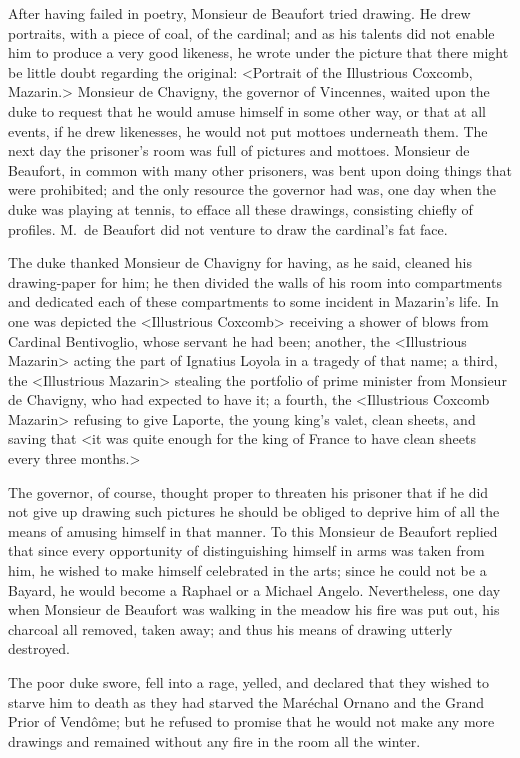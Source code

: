 After having failed in poetry, Monsieur de Beaufort tried drawing. He drew portraits, with a piece of coal, of the cardinal; and as his talents did not enable him to produce a very good likeness, he wrote under the picture that there might be little doubt regarding the original: <Portrait of the Illustrious Coxcomb, Mazarin.> Monsieur de Chavigny, the governor of Vincennes, waited upon the duke to request that he would amuse himself in some other way, or that at all events, if he drew likenesses, he would not put mottoes underneath them. The next day the prisoner's room was full of pictures and mottoes. Monsieur de Beaufort, in common with many other prisoners, was bent upon doing things that were prohibited; and the only resource the governor had was, one day when the duke was playing at tennis, to efface all these drawings, consisting chiefly of profiles. M.~de Beaufort did not venture to draw the cardinal's fat face.

The duke thanked Monsieur de Chavigny for having, as he said, cleaned his drawing-paper for him; he then divided the walls of his room into compartments and dedicated each of these compartments to some incident in Mazarin's life. In one was depicted the <Illustrious Coxcomb> receiving a shower of blows from Cardinal Bentivoglio, whose servant he had been; another, the <Illustrious Mazarin> acting the part of Ignatius Loyola in a tragedy of that name; a third, the <Illustrious Mazarin> stealing the portfolio of prime minister from Monsieur de Chavigny, who had expected to have it; a fourth, the <Illustrious Coxcomb Mazarin> refusing to give Laporte, the young king's valet, clean sheets, and saving that <it was quite enough for the king of France to have clean sheets every three months.>

The governor, of course, thought proper to threaten his prisoner that if he did not give up drawing such pictures he should be obliged to deprive him of all the means of amusing himself in that manner. To this Monsieur de Beaufort replied that since every opportunity of distinguishing himself in arms was taken from him, he wished to make himself celebrated in the arts; since he could not be a Bayard, he would become a Raphael or a Michael Angelo. Nevertheless, one day when Monsieur de Beaufort was walking in the meadow his fire was put out, his charcoal all removed, taken away; and thus his means of drawing utterly destroyed.

The poor duke swore, fell into a rage, yelled, and declared that they wished to starve him to death as they had starved the Maréchal Ornano and the Grand Prior of Vendôme; but he refused to promise that he would not make any more drawings and remained without any fire in the room all the winter.

